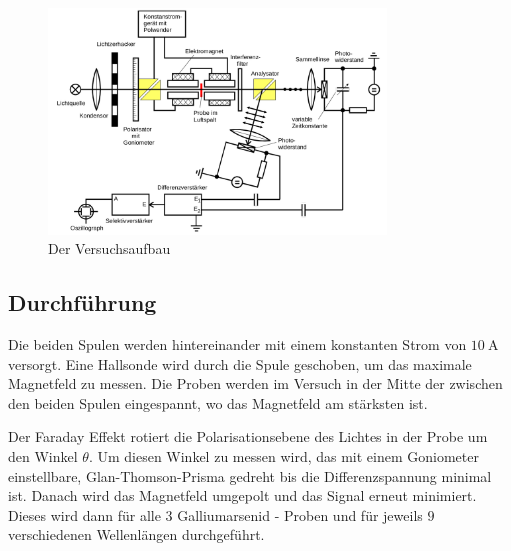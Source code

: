 \begin{figure}
	\centering
	\includegraphics[width=0.8\textwidth]{./Bilder/aufbau.png}
	\caption{Der Versuchsaufbau \cite{man}}\label{fig:aufbau}
\end{figure}

\subsection{Durchführung}
Die beiden Spulen werden hintereinander mit einem konstanten Strom von
$\qty{10}{\ampere}$ versorgt. Eine Hallsonde wird durch die Spule geschoben, um
das maximale Magnetfeld zu messen. Die Proben werden im Versuch in der Mitte
der zwischen den beiden Spulen eingespannt, wo das Magnetfeld am stärksten ist.

Der Faraday Effekt rotiert die Polarisationsebene des Lichtes in der Probe um
den Winkel $\theta$. Um diesen Winkel zu messen wird, das mit einem Goniometer
einstellbare, Glan-Thomson-Prisma gedreht bis die Differenzspannung minimal
ist. Danach wird das Magnetfeld umgepolt und das Signal erneut minimiert.
Dieses wird dann für alle $3$ Galliumarsenid - Proben und für jeweils $9$
verschiedenen Wellenlängen durchgeführt.

\newpage